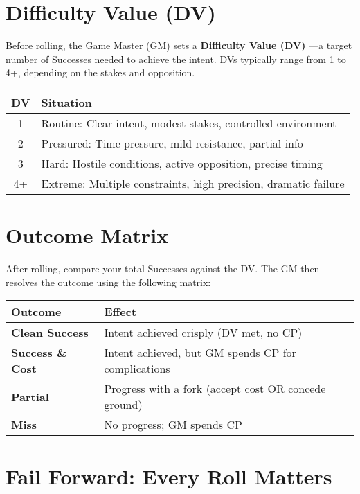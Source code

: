 \section{Difficulty Value (DV)}

Before rolling, the Game Master (GM) sets a \textbf{Difficulty Value (DV)} —a target number of Successes needed to achieve the intent. DVs typically range from 1 to 4+, depending on the stakes and opposition.

\begin{center}
\begin{tabular}{cl}
\toprule
\textbf{DV} & \textbf{Situation} \\
\midrule
1 & Routine: Clear intent, modest stakes, controlled environment \\
2 & Pressured: Time pressure, mild resistance, partial info \\
3 & Hard: Hostile conditions, active opposition, precise timing \\
4+ & Extreme: Multiple constraints, high precision, dramatic failure \\
\bottomrule
\end{tabular}
\end{center}

\section{Outcome Matrix}

After rolling, compare your total Successes against the DV. The GM then resolves the outcome using the following matrix:

\begin{center}
\begin{tabular}{ll}
\toprule
\textbf{Outcome} & \textbf{Effect} \\
\midrule
\textbf{Clean Success} & Intent achieved crisply (DV met, no CP) \\
\textbf{Success \& Cost} & Intent achieved, but GM spends CP for complications \\
\textbf{Partial} & Progress with a fork (accept cost OR concede ground) \\
\textbf{Miss} & No progress; GM spends CP \\
\bottomrule
\end{tabular}
\end{center}

\section{Fail Forward: Every Roll Matters}

